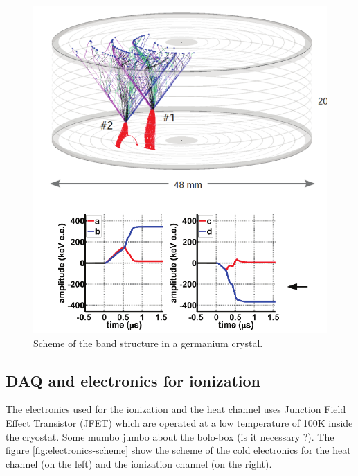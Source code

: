 \begin{figure}
\centering
\includegraphics[height=0.5\textheight]{Figures/Electrodes/charge_drifting.pdf}
\caption{Scheme of the band structure in a germanium crystal.}
\label{fig:charge-drifting}
\end{figure}


\subsection{DAQ and electronics for ionization}
\label{par:electronics-ionization}

The electronics used for the ionization and the heat channel uses Junction Field Effect Transistor (JFET) which are operated at a low temperature of 100K inside the cryostat.
Some mumbo jumbo about the bolo-box (is it necessary ?).
The figure \ref{fig:electronics-scheme} show the scheme of the cold electronics for the heat channel (on the left) and the ionization channel (on the right).

